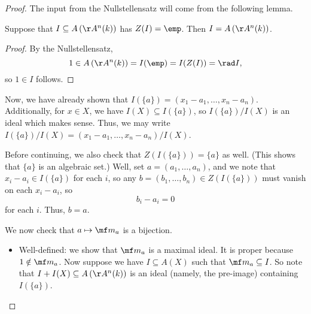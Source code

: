 \documentclass[../notes.tex]{subfiles}
\begin{document}
\begin{proof}
	The input from the Nullstellensatz will come from the following lemma.
	\begin{lemma} \label{lem:zeroempty}
		Suppose that $I\subseteq A\left(\AA^n(k)\right)$ has $Z(I)=\emp$. Then $I=A\left(\AA^n(k)\right)$.
	\end{lemma}
	\begin{proof}
		By the Nullstellensatz,
		\[1\in A\left(\AA^n(k)\right)=I(\emp)=I(Z(I))=\rad I,\]
		so $1\in I$ follows.
	\end{proof}
	Now, we have already shown that $I(\{a\})=(x_1-a_1,\ldots,x_n-a_n)$. Additionally, for $x\in X$, we have $I(X)\subseteq I(\{a\})$, so $I(\{a\})/I(X)$ is an ideal which makes sense. Thus, we may write $I(\{a\})/I(X)=(x_1-a_1,\ldots,x_n-a_n)/I(X)$.
	
	Before continuing, we also check that $Z(I(\{a\}))=\{a\}$ as well. (This shows that $\{a\}$ is an algebraic set.) Well, set $a=(a_1,\ldots,a_n)$, and we note that $x_i-a_i\in I(\{a\})$ for each $i$, so any $b=(b_1,\ldots,b_n)\in Z(I(\{a\}))$ must vanish on each $x_i-a_i$, so
	\[b_i-a_i=0\]
	for each $i$. Thus, $b=a$.

	We now check that $a\mapsto\mf m_a$ is a bijection.
	\begin{itemize}
		\item Well-defined: we show that $\mf m_a$ is a maximal ideal. It is proper because $1\notin\mf m_a$. Now suppose we have $I\subseteq A(X)$ such that $\mf m_a\subseteq I$. So note that $I+I(X)\subseteq A\left(\AA^n(k)\right)$ is an ideal (namely, the pre-image) containing $I(\{a\})$.


\end{itemize}
\end{proof}
\end{document}
